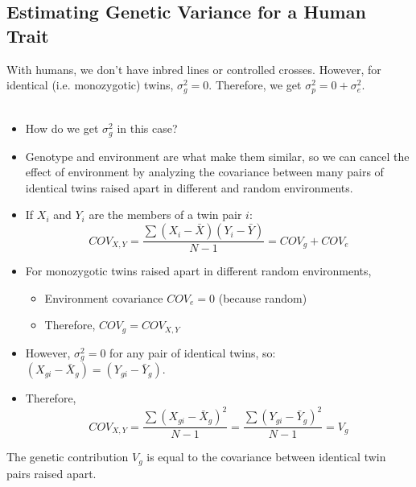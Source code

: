 \documentclass[10pt]{article}
\begin{document}
\subsection*{Estimating Genetic Variance for a Human Trait}
With humans, we don't have inbred lines or controlled crosses.  However, for identical (i.e. monozygotic) twins, $\sigma_g^2 = 0$.  Therefore, we get $\sigma_p^2 = 0 + \sigma_e^2$. \\\\
\begin{itemize}
	\item How do we get $\sigma_g^2$ in this case?
	\item Genotype and environment are what make them similar, so we can cancel the effect of environment by analyzing the covariance between many pairs of identical twins raised apart in different and random environments.
	\item If $X_i$ and $Y_i$ are the members of a twin pair $i$:
	\[COV_{X, Y} = \frac{\sum (X_i - \bar{X})(Y_i - \bar{Y})}{N - 1} = COV_g + COV_e\]
    \item For monozygotic twins raised apart in different random environments,
    \begin{itemize}
	    \item Environment covariance $COV_e = 0$ (because random)
	    \item Therefore, $COV_g = COV_{X, Y}$
    \end{itemize}
    \item However, $\sigma_g^2 = 0$ for any pair of identical twins, so: $(X_{gi} - \bar{X}_g) = (Y_{gi} - \bar{Y}_g)$.
    \item Therefore,
    \[COV_{X, Y} = \frac{\sum (X_{gi} - \bar{X}_g)^2}{N - 1} = \frac{\sum (Y_{gi} - \bar{Y}_g)^2}{N - 1} = V_g\]
\end{itemize}
The genetic contribution $V_g$ is equal to the covariance between identical twin pairs raised apart.
\end{document}
